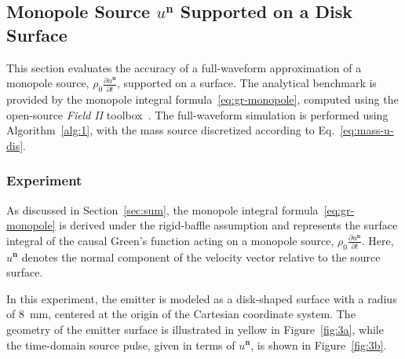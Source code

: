 \documentclass[11pt,reqno]{amsart}
\theoremstyle{remark}
\theoremstyle{italic_lemma}
\newcommand{\bn}{\boldsymbol{n}}
\begin{document}
\subsection{Monopole Source \( u^{\textbf{n}} \) Supported on a Disk Surface}
\label{sec:re-mo}

This section evaluates the accuracy of a full-waveform approximation of a monopole source, \( \rho_0 \frac{\partial u^{\bn}}{\partial t} \), supported on a surface. The analytical benchmark is provided by the monopole integral formula~\eqref{eq:gr-monopole}, computed using the open-source \emph{Field II} toolbox~\cite{Jensen1,Jensen2}. The full-waveform simulation is performed using Algorithm~\ref{alg:1}, with the mass source discretized according to Eq.~\eqref{eq:mass-u-dis}.


\subsubsection{Experiment}

As discussed in Section~\ref{sec:sum}, the monopole integral formula~\eqref{eq:gr-monopole} is derived under the rigid-baffle assumption and represents the surface integral of the causal Green's function acting on a monopole source, \( \rho_0 \frac{\partial u^{\bn}}{\partial t} \). Here, \( u^{\bn} \) denotes the normal component of the velocity vector relative to the source surface.

In this experiment, the emitter is modeled as a disk-shaped surface with a radius of 8~mm, centered at the origin of the Cartesian coordinate system. The geometry of the emitter surface is illustrated in yellow in Figure~\ref{fig:3a}, while the time-domain source pulse, given in terms of \( u^{\bn} \), is shown in Figure~\ref{fig:3b}.
\end{document}
